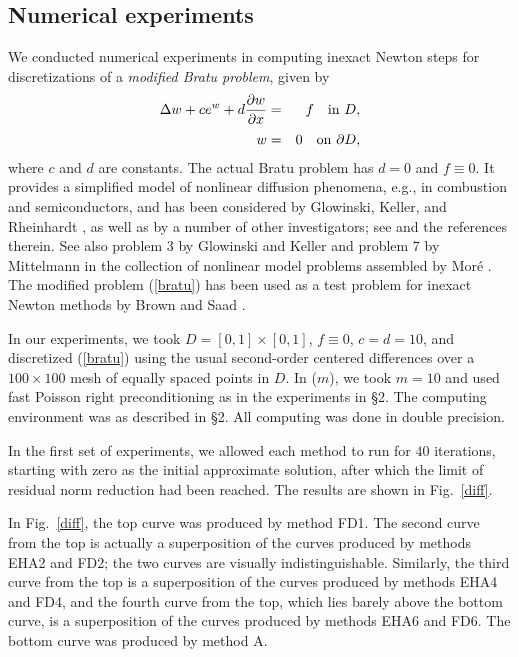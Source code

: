 \subsection{Numerical experiments}
We conducted numerical experiments 
in computing inexact Newton steps for discretizations of a  
{\em modified Bratu problem}, given by  
\begin{eqnarray} 
{\displaystyle\Delta w + c e^w + d{ \frac{\partial w}{\partial x} } } 
&=&{\displaystyle f \quad {\rm in}\ D, }\nonumber\\[-1.5ex]
\label{bratu} \\[-1.5ex]
{\displaystyle w }&=&{\displaystyle 0 \quad {\rm on}\ \partial D , } \nonumber
\end{eqnarray} 
where $c$ and $d$ are constants. The actual Bratu problem has $d=0$ and  
$f \equiv0$. It provides a simplified model of nonlinear diffusion  
phenomena, e.g., in combustion and semiconductors, and has been 
considered by Glowinski, Keller, and Rheinhardt \cite{Paris-2008}, 
as well as by a number of other investigators; see \cite{Brachmann.etal-2007} 
and the references therein. See also problem 3 by Glowinski and  Keller  
and problem 7 by Mittelmann in the collection of nonlinear model 
problems assembled by Mor\'e \cite{Yang.etal-2007}. The modified problem  
(\ref{bratu}) has been used as a test problem for inexact Newton 
methods by Brown and Saad \cite{Smith.etal-2008}.

In our experiments, we took $D = [0,1]\times[0,1]$, $f \equiv0$, 
$c=d=10$, and discretized (\ref{bratu}) using the usual second-order 
centered differences over a $100\times100$ mesh of equally 
spaced points in $D$. In \gmres($m$), we took $m=10$ and used fast  
Poisson right preconditioning as in the experiments in \S2. The computing  
environment was as described in \S2. All computing was done  
in double precision.


In the first set of experiments, we allowed each method to  
run for $40$ {\gmresm} iterations, starting with zero as the initial  
approximate solution, after which the limit of residual norm  
reduction had been reached. The results are shown in Fig.~\ref{diff}.  



In Fig.~\ref{diff}, the top curve was produced by method FD1. 
The second curve from the top is actually a superposition of  
the curves produced by methods EHA2 and FD2; the two curves are 
visually indistinguishable. Similarly, the third curve from  
the top is a superposition of the curves produced by methods EHA4 
and FD4, and the fourth curve from the top, which lies barely above  
the bottom curve, is a superposition of the curves produced by  
methods EHA6 and FD6. The bottom curve was produced by method A.


